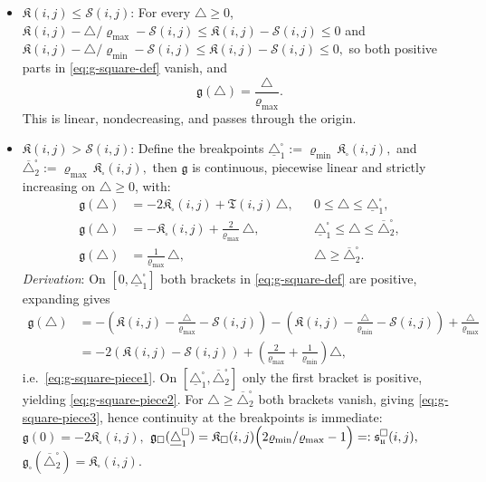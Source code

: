\documentclass[twoside,11pt]{article}
\numberwithin{equation}{section}
\numberwithin{theorem}{section}
\numberwithin{example}{section}
\begin{document}
\begin{itemize}
\item[(i)] $\mathfrak K(i,j)\le \mathscr S(i,j)$: 
For every $\triangle\ge 0$,
\(
\mathfrak K(i,j)-{\triangle}/{\varrho_{\max}}-\mathscr S(i,j)
 \le
\mathfrak K(i,j)-\mathscr S(i,j) \le 0
\)
and
\(\mathfrak K(i,j)-{\triangle}/{\varrho_{\min}}-\mathscr S(i,j)
\le 
\mathfrak K(i,j)-\mathscr S(i,j) \le 0,
\)
so both positive parts in \eqref{eq:g-square-def} vanish, and
\begin{equation}
\label{eq:g-square-regime0}
\mathfrak g(\triangle)=\frac{\triangle}{\varrho_{\max}}.
\end{equation}
This is linear, nondecreasing, and passes through the origin.
\item[(ii)] $\mathfrak K(i,j)> \mathscr S(i,j)$: Define the breakpoints
\(
\underline{\triangle}_1^{\square}:=\varrho_{\min}\,\mathfrak K_{\square}(i,j),
\) and \(
\overline{\triangle}_2^{\square}:=\varrho_{\max}\,\mathfrak K_{\square}(i,j),
\)
then $\mathfrak g$ is continuous, piecewise linear and strictly increasing on $\triangle\ge 0$, with:
\begin{align}
\label{eq:g-square-piece1}
\mathfrak g(\triangle)
&=
-2\mathfrak K_{\square}(i,j)+\mathfrak T(i,j)\,\triangle,
&& 0\le \triangle\le \underline{\triangle}_1^{\square},
\\[3pt]
\label{eq:g-square-piece2}
\mathfrak g(\triangle)
&=
-\mathfrak K_{\square}(i,j)+\frac{2}{\varrho_{\max}}\,\triangle,
&& \underline{\triangle}_1^{\square}\le \triangle\le \overline{\triangle}_2^{\square},
\\[3pt]
\label{eq:g-square-piece3}
\mathfrak g(\triangle)
&=
\frac{1}{\varrho_{\max}}\,\triangle,
&& \triangle\ge \overline{\triangle}_2^{\square}.
\end{align}
\emph{Derivation}: On $[0,\underline{\triangle}_1^{\square}]$ both brackets in \eqref{eq:g-square-def} are positive, expanding gives
\[
\begin{aligned}
\mathfrak g(\triangle)
&= -\left(\mathfrak K(i,j)-\frac{\triangle}{\varrho_{\max}}-\mathscr S(i,j)\right)-\left(\mathfrak K(i,j)-\frac{\triangle}{\varrho_{\min}}-\mathscr S(i,j)\right)+\tfrac{\triangle}{\varrho_{\max}}\\
&= -2\left(\mathfrak K(i,j)-\mathscr S(i,j)\right) + \left(\frac{2}{\varrho_{\max}}+\frac{1}{\varrho_{\min}}\right)\triangle,
\end{aligned}
\]
i.e.\ \eqref{eq:g-square-piece1}. On $[\underline{\triangle}_1^{\square},\overline{\triangle}_2^{\square}]$ only the first bracket is positive, yielding \eqref{eq:g-square-piece2}. For $\triangle\ge \overline{\triangle}_2^{\square}$ both brackets vanish, giving \eqref{eq:g-square-piece3}, hence continuity at the breakpoints is immediate:
\(
\mathfrak g(0)=-2\mathfrak K_{\square}(i,j),\) 
\(\mathfrak g_{\square}(\underline{\triangle}_1^{\square})
=\mathfrak K_{\square}(i,j)\Bigl(2{\varrho_{\min}}/{\varrho_{\max}}-1\Bigr)=:\mathfrak s_{\mathfrak u}^{\square}(i,j),
\) \(
\mathfrak g_{\square}(\overline{\triangle}_2^{\square})=\mathfrak K_{\square}(i,j).
\)
\end{itemize}
\end{document}
